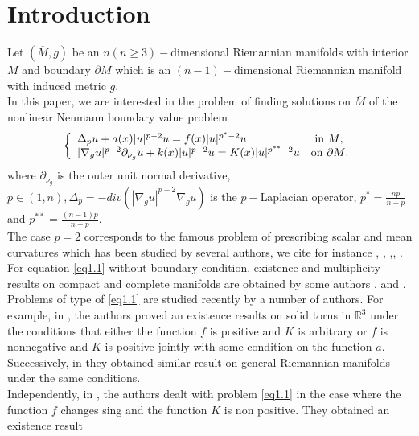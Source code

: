 \documentclass{Tran-l}
\theoremstyle{definition}
\theoremstyle{remark}
\numberwithin{equation}{section}
\begin{document}
\section{Introduction}
Let $(\overline M,g)$ be an $n(n\geq3)-$dimensional Riemannian
manifolds with interior $M$ and boundary $\partial M$ which is an
$(n-1)-$dimensional Riemannian manifold with induced metric $g$.\\
In this paper, we are interested in the problem of finding solutions
on $\overline M$ of the nonlinear Neumann boundary value problem
\begin{equation}\label{eq1.1}
    \left\{
       \begin{array}{ll}
         \Delta_pu+a(x)|u|^{p-2}u=f(x)|u|^{p^*-2}u& \hbox{ in $M$;}\\
         |\nabla_g u|^{p-2}\partial_{\nu_g}u+k(x)|u|^{p-2}u=K(x)|u|^{p^{**}-2}u&
 \hbox{on $\partial M$.}
       \end{array}
     \right.
\end{equation}
where $ \partial_{\nu_g}$ is the outer unit normal derivative,
$p\in(1,n),\Delta_p=-div(|\nabla_gu|^{p-2}\nabla_gu)$ is the
$p-$Laplacian
operator, $p^*=\frac{np}{n-p}$ and $p^{**}=\frac{(n-1)p}{n-p}$.\\
The case $p=2$  corresponds to the famous problem of prescribing
scalar and mean curvatures which has been studied by several
authors, we cite for instance \cite[22]{Escobar1}, \cite{cherrier},
\cite{Ambrosetti-Li-MAlchiodi},\cite{Ambrosetti-Li-MAlchiodi1},
\cite{Djadli-Malchiodi-Ahmedou}. \\
For equation \eqref{eq1.1} without boundary condition, existence and
multiplicity results on compact and complete manifolds are obtained
by some authors \cite{aubin-cotsiolis}, \cite[9,10]{BenaliliMaliki1}
and
\cite{Druet}.\\
Problems of type of \eqref{eq1.1} are studied recently by a number
of authors. For example, in \cite{cotsiolis-labropoulos}, the
authors proved an existence results on solid torus in $\mathbb{R}^3$
under the conditions that either the function $f$ is positive and
$K$ is arbitrary or $f$ is nonnegative and  $K$ is positive jointly
with some condition on the function $a$. Successively, in
\cite{cotsiolis-labropoulos1} they obtained similar result on
general Riemannian manifolds under the same conditions.\\
Independently, in \cite{Yasov-Runst}, the authors dealt with problem
\eqref{eq1.1} in the case where the function $f$ changes sing and
the function $K$ is non positive. They obtained an existence result
\end{document}
